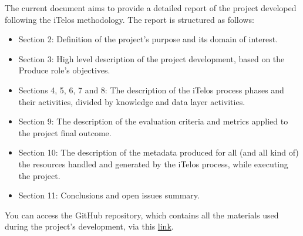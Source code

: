 \noindent The current document aims to provide a detailed report of the project developed following the iTelos methodology. The report is structured as follows:
\begin{itemize}
    \item Section 2: Definition of the project's purpose and its domain of interest.

    \item Section 3: High level description of the project development, based on the Produce role's objectives.  
    
    \item Sections 4, 5, 6, 7 and 8: The description of the iTelos process phases and their activities, divided by knowledge and data layer activities.
    
    \item Section 9: The description of the evaluation criteria and metrics applied to the project final outcome.

    \item Section 10: The description of the metadata produced for all (and all kind of) the resources handled and generated by the iTelos process, while executing the project.

    \item Section 11: Conclusions and open issues summary.
\end{itemize}

\noindent You can access the GitHub repository, which contains all the materials used during the project's development, via this \href{https://github.com/christiansassi/knowledge-graph-engineering-project}{link}.